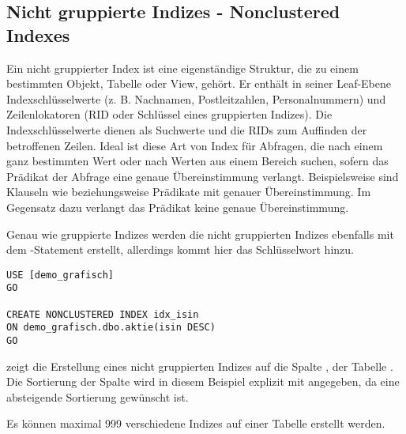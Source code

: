       \subsection{Nicht gruppierte Indizes - Nonclustered Indexes}
        Ein nicht gruppierter Index ist eine eigenständige Struktur, die
        zu einem bestimmten Objekt, Tabelle oder View, gehört. Er enthält in
        seiner Leaf-Ebene Indexschlüsselwerte (z. B. Nachnamen, Postleitzahlen,
        Personalnummern) und Zeilenlokatoren (RID oder Schlüssel eines
        gruppierten Indizes). Die Indexschlüsselwerte dienen als Suchwerte und
        die RIDs zum Auffinden der betroffenen Zeilen.
        Ideal ist diese Art von Index für Abfragen, die nach einem ganz
        bestimmten Wert oder nach Werten aus einem Bereich suchen, sofern das
        Prädikat der Abfrage eine genaue Übereinstimmung verlangt.
        Beispielsweise sind Klauseln wie 
        beziehungsweise
        Prädikate mit genauer Übereinstimmung. Im Gegensatz dazu verlangt das
        Prädikat  keine genaue
        Übereinstimmung.
        \begin{literaturinternet}
          \item \cite{ms189605}
        \end{literaturinternet}
        Genau wie gruppierte Indizes werden die nicht gruppierten Indizes
        ebenfalls mit dem -Statement erstellt,
        allerdings kommt hier das Schlüsselwort  hinzu.
        \begin{lstlisting}[language=ms_sql, caption={Erstellen eines
        nicht gruppierten Index}, label=admin05_08]
USE [demo_grafisch]
GO

CREATE NONCLUSTERED INDEX idx_isin
ON demo_grafisch.dbo.aktie(isin DESC)
GO
        \end{lstlisting}
         zeigt die Erstellung eines nicht gruppierten
        Indizes auf die Spalte , der Tabelle
        . Die Sortierung der Spalte  wird in
        diesem Beispiel explizit mit angegeben, da eine absteigende Sortierung
        gewünscht ist.
        \begin{merke}
          Es können maximal 999 verschiedene Indizes auf einer Tabelle erstellt
          werden.
        \end{merke}
